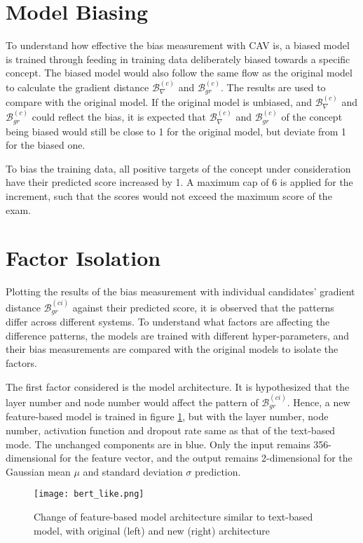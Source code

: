 \section{Model Biasing}
To understand how effective the bias measurement with CAV is, a biased model is trained through feeding in training data deliberately biased towards a specific concept. The biased model would also follow the same flow as the original model to calculate the gradient distance $\mathcal{B}^{(c)}_{\nabla}$ and $\mathcal{B}^{(c)}_{gr}$. The results are used to compare with the original model. If the original model is unbiased, and $\mathcal{B}^{(c)}_{\nabla}$ and $\mathcal{B}^{(c)}_{gr}$ could reflect the bias, it is expected that $\mathcal{B}^{(c)}_{\nabla}$ and $\mathcal{B}^{(c)}_{gr}$ of the concept being biased would still be close to 1 for the original model, but deviate from 1 for the biased one.

To bias the training data, all positive targets of the concept under consideration have their predicted score increased by 1. A maximum cap of 6 is applied for the increment, such that the scores would not exceed the maximum score of the exam.

\section{Factor Isolation}
Plotting the results of the bias measurement with individual candidates' gradient distance $\mathcal{B}^{(ci)}_{gr}$ against their predicted score, it is observed that the patterns differ across different systems. To understand what factors are affecting the difference patterns, the models are trained with different hyper-parameters, and their bias measurements are compared with the original models to isolate the factors.

The first factor considered is the model architecture. It is hypothesized that the layer number and node number would affect the pattern of $\mathcal{B}^{(ci)}_{gr}$. Hence, a new feature-based model is trained in figure \ref{fig:bert_like}, but with the layer number, node number, activation function and dropout rate same as that of the text-based mode. The unchanged components are in blue. Only the input remains 356-dimensional for the feature vector, and the output remains 2-dimensional for the Gaussian mean $\mu$ and standard deviation $\sigma$ prediction.

\begin{figure}[H]
    \centering
    \texttt{[image: bert\_like.png]}
    \caption{Change of feature-based model architecture similar to text-based model, with original (left) and new (right) architecture}
    \label{fig:bert_like}
\end{figure}

